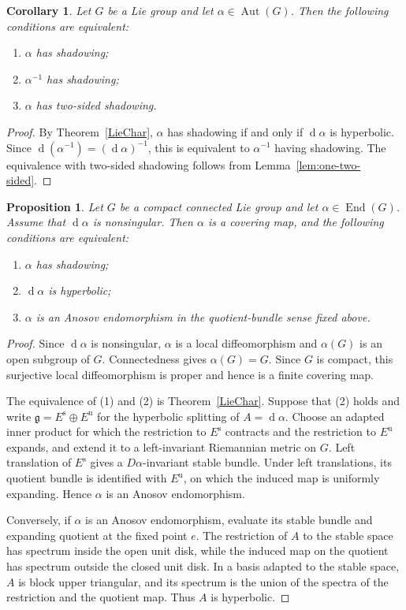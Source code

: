 \documentclass[12pt]{amsart}
\newtheorem{corollary}[theorem]{Corollary}
\newtheorem{proposition}[theorem]{Proposition}
\theoremstyle{definition}
\numberwithin{equation}{section}
\theoremstyle{remark}
\DeclareMathOperator{\di}{d}
\begin{document}
\begin{corollary}\label{twos}
Let $G$ be a Lie group and let $\alpha\in\operatorname{Aut}(G)$. Then the
following conditions are equivalent:
\begin{enumerate}
\item $\alpha$ has shadowing;
\item $\alpha^{-1}$ has shadowing;
\item $\alpha$ has two-sided shadowing.
\end{enumerate}
\end{corollary}

\begin{proof}
By Theorem~\ref{LieChar}, $\alpha$ has shadowing if and only if
$\di\alpha$ is hyperbolic. Since $\di(\alpha^{-1})=(\di\alpha)^{-1}$, this
is equivalent to $\alpha^{-1}$ having shadowing. The equivalence with
two-sided shadowing follows from Lemma~\ref{lem:one-two-sided}.
\end{proof}

\begin{proposition}\label{prop:Lie-Anosov-endomorphism}
Let $G$ be a compact connected Lie group and let
$\alpha\in\operatorname{End}(G)$. Assume that $\di\alpha$ is nonsingular.
Then $\alpha$ is a covering map, and the following conditions are
equivalent:
\begin{enumerate}
\item $\alpha$ has shadowing;
\item $\di\alpha$ is hyperbolic;
\item $\alpha$ is an Anosov endomorphism in the quotient-bundle sense fixed
above.
\end{enumerate}
\end{proposition}

\begin{proof}
Since $\di\alpha$ is nonsingular, $\alpha$ is a local diffeomorphism and
$\alpha(G)$ is an open subgroup of $G$. Connectedness gives
$\alpha(G)=G$. Since $G$ is compact, this surjective local diffeomorphism is
proper and hence is a finite covering map.

The equivalence of (1) and (2) is Theorem~\ref{LieChar}. Suppose that (2)
holds and write
$\mathfrak g=E^{\mathrm s}\oplus E^{\mathrm u}$ for the hyperbolic
splitting of $A=\di\alpha$. Choose an adapted inner product for which the
restriction to $E^{\mathrm s}$ contracts and the restriction to
$E^{\mathrm u}$ expands, and extend it to a left-invariant Riemannian metric
on $G$. Left translation of $E^{\mathrm s}$ gives a $D\alpha$-invariant
stable bundle. Under left translations, its quotient bundle is identified
with $E^{\mathrm u}$, on which the induced map is uniformly expanding.
Hence $\alpha$ is an Anosov endomorphism.

Conversely, if $\alpha$ is an Anosov endomorphism, evaluate its stable
bundle and expanding quotient at the fixed point $e$. The restriction of
$A$ to the stable space has spectrum inside the open unit disk, while the
induced map on the quotient has spectrum outside the closed unit disk. In a
basis adapted to the stable space, $A$ is block upper triangular, and its
spectrum is the union of the spectra of the restriction and the quotient
map. Thus $A$ is hyperbolic.
\end{proof}
\end{document}
